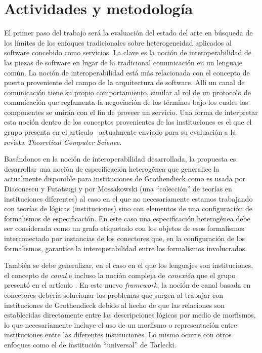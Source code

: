 \documentclass[a4paper, 11pt]{article}
\begin{document}
\section{Actividades y metodología}
El primer paso del trabajo será la evaluación del estado del arte en búsqueda de los límites de los enfoques tradicionales sobre heterogeneidad aplicados al software concebido como servicios. La clave es la noción de interoperabilidad de las piezas de software en lugar de la tradicional comunicación en un lenguaje común. La noción de interoperabilidad está más relacionada con el concepto de puerto proveniente del campo de la arquitectura de software. Allí un canal de comunicación tiene su propio comportamiento, similar al rol de un protocolo de comunicación que reglamenta la negociación de los términos bajo los cuales los componentes se unirán con el fin de proveer un servicio. Una forma de interpretar esta noción dentro de los conceptos provenientes de las instituciones es el que el grupo presenta en el artículo \paperola\ actualmente enviado para su evaluación a la revista \emph{Theoretical Computer Science}.

Basándonos en la noción de interoperabilidad desarrollada, la propuesta es desarrollar una noción de especificación heterogénea que generalice la actualmente disponible para instituciones de Grothendieck \cite{diaconescu:acs-10_4} como es usada por Diaconescu y Futatsugi \cite{diaconescu:tcs-285_2} y por Mossakowski \cite{mossakowski:tacas07} (una ``colección'' de teorías en instituciones diferentes) al caso en el que no necesariamente estamos trabajando con teorías de lógicas (instituciones) sino con elementos de una configuración de formalismos de especificación. En este caso una especificación heterogénea debe ser considerada como un grafo etiquetado con los objetos de esos formalismos interconectado por instancias de los conectores que, en la configuración de los formalismos, garantice la interoperabilidad entre los formalismos involucrados.

También se debe generalizar, en el caso en el que los lenguajes son instituciones, el concepto de \emph{canal} \cite{fiadeiro:amast96} e incluso la noción compleja de \emph{conexión} que el grupo presentó en el artículo \paperola. En este nuevo \emph{framework}, la noción de canal basada en conectores debería solucionar los problemas que surgen al trabajar con instituciones de Grothendieck debido al hecho de que las relaciones son establecidas directamente entre las descripciones lógicas por medio de morfismos, lo que necesariamente incluye el uso de un morfismo\cite{goguen:fac-02-13} o representación entre instituciones entre las diferentes instituciones. Lo mismo ocurre con otros enfoques como el de institución ``universal'' de Tarlecki.
\end{document}

